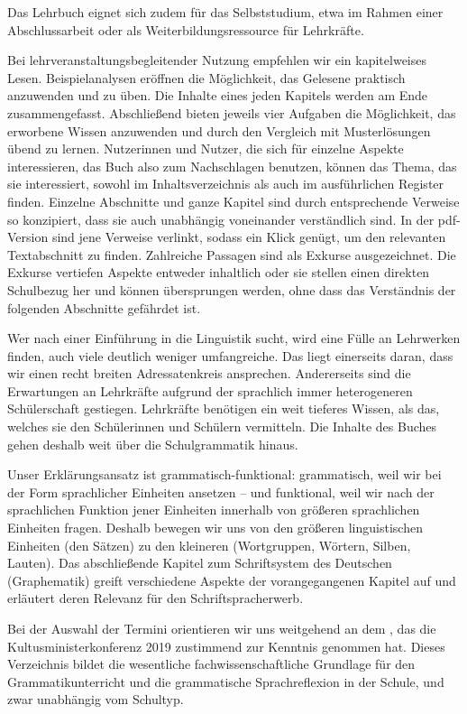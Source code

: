 \begin{refsection}
Das Lehrbuch eignet sich zudem für das Selbststudium, etwa im Rahmen einer Abschlussarbeit oder als Weiterbildungsressource für Lehrkräfte. 

Bei lehrveranstaltungsbegleitender Nutzung empfehlen wir ein kapitelweises Lesen. Beispielanalysen eröffnen die Möglichkeit, das Gelesene praktisch anzuwenden und zu üben. Die Inhalte eines jeden Kapitels werden am Ende zusammengefasst. Abschließend bieten jeweils vier Aufgaben die Möglichkeit, das erworbene Wissen anzuwenden und durch den Vergleich mit Musterlösungen übend zu lernen. Nutzerinnen und Nutzer, die sich für einzelne Aspekte interessieren, das Buch also zum Nachschlagen benutzen, können das Thema, das sie interessiert, sowohl im Inhaltsverzeichnis als auch im ausführlichen Register finden. Einzelne Abschnitte und ganze Kapitel sind durch entsprechende Verweise so konzipiert, dass sie auch unabhängig voneinander verständlich sind. In der pdf-Version sind jene Verweise verlinkt, sodass ein Klick genügt, um den relevanten Textabschnitt zu finden. Zahlreiche Passagen sind als Exkurse ausgezeichnet. Die Exkurse vertiefen Aspekte entweder inhaltlich oder sie stellen einen direkten Schulbezug her und können übersprungen werden, ohne dass das Verständnis der folgenden Abschnitte gefährdet ist.

Wer nach einer Einführung in die Linguistik sucht, wird eine Fülle an Lehrwerken finden, auch viele deutlich weniger umfangreiche. Das liegt einerseits daran, dass wir einen recht breiten Adressatenkreis ansprechen. Andererseits sind die Erwartungen an Lehrkräfte aufgrund der sprachlich immer heterogeneren Schülerschaft gestiegen. Lehrkräfte benötigen ein weit tieferes Wissen, als das, welches sie den Schülerinnen und Schülern vermitteln. Die Inhalte des Buches gehen deshalb weit über die Schulgrammatik hinaus.

Unser Erklärungsansatz ist grammatisch-funktional: grammatisch, weil wir bei der Form sprachlicher Einheiten ansetzen – und funktional, weil wir nach der sprachlichen Funktion jener Einheiten innerhalb von größeren sprachlichen Einheiten fragen. Deshalb bewegen wir uns von den größeren linguistischen Einheiten (den Sätzen) zu den kleineren (Wortgruppen, Wörtern, Silben, Lauten). Das abschließende Kapitel zum Schriftsystem des Deutschen (Graphematik) greift verschiedene Aspekte der vorangegangenen Kapitel auf und erläutert deren Relevanz für den Schriftspracherwerb.

Bei der Auswahl der Termini orientieren wir uns weitgehend an dem \citet{KMK2019}, das die Kultusministerkonferenz 2019 zustimmend zur Kenntnis genommen hat. Dieses Verzeichnis bildet die wesentliche fachwissenschaftliche Grundlage für den Grammatikunterricht und die grammatische Sprachreflexion in der Schule, und zwar unabhängig vom Schultyp.


\end{refsection}
